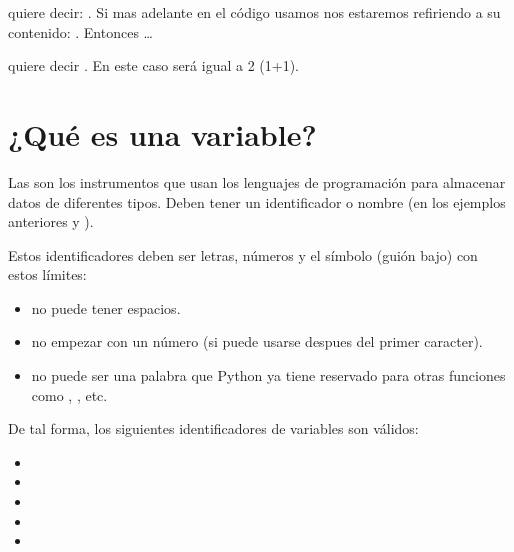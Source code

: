 \documentclass[a4paper,12pt,spanish]{sphinxmanual}
\begin{document}
\sphinxAtStartPar
quiere decir:  .
Si mas adelante en el código usamos  nos estaremos refiriendo a su contenido: .
Entonces …

\begin{sphinxVerbatim}[commandchars=\\\{\}]
    
\end{sphinxVerbatim}

\sphinxAtStartPar
quiere decir  .
En este caso  será igual a 2 (1+1).


\section{¿Qué es una variable?}
\label{\detokenize{interactivo:que-es-una-variable}}
\sphinxAtStartPar
Las  son los instrumentos que usan los lenguajes de programación para
almacenar datos de diferentes tipos.
Deben tener un identificador o nombre (en los ejemplos anteriores  y ).

\sphinxAtStartPar
Estos identificadores deben ser letras, números y el símbolo \sphinxstyleemphasis{\_} (guión bajo) con estos límites:
\begin{itemize}
\item {} 
\sphinxAtStartPar
no puede tener espacios.

\item {} 
\sphinxAtStartPar
no empezar con un número (si puede usarse despues del primer caracter).

\item {} 
\sphinxAtStartPar
no puede ser una palabra que Python ya tiene reservado para otras funciones como , , etc.

\end{itemize}

\sphinxAtStartPar
De tal forma, los siguientes identificadores de variables son válidos:
\begin{itemize}
\item {} 
\sphinxAtStartPar
{}

\item {} 
\sphinxAtStartPar
{}

\item {} 
\sphinxAtStartPar
{}

\item {} 
\sphinxAtStartPar
{}

\item {} 
\sphinxAtStartPar
{}

\end{itemize}
\end{document}

